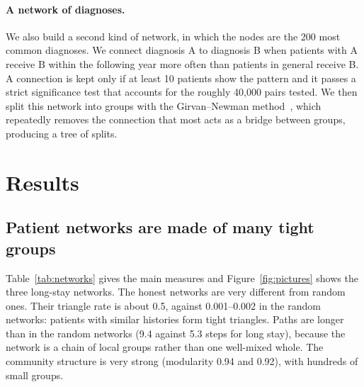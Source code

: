 \documentclass[11pt]{article}
\begin{document}
\paragraph{A network of diagnoses.} We also build a second kind of network, in which the nodes are the 200 most common diagnoses. We connect diagnosis A to diagnosis B when patients with A receive B within the following year more often than patients in general receive B. A connection is kept only if at least 10 patients show the pattern and it passes a strict significance test that accounts for the roughly 40,000 pairs tested. We then split this network into groups with the Girvan--Newman method~\cite{girvan2002community}, which repeatedly removes the connection that most acts as a bridge between groups, producing a tree of splits.

\section{Results}
\label{sec:results}

\subsection{Patient networks are made of many tight groups}

Table~\ref{tab:networks} gives the main measures and Figure~\ref{fig:pictures} shows the three long-stay networks. The honest networks are very different from random ones. Their triangle rate is about 0.5, against 0.001--0.002 in the random networks: patients with similar histories form tight triangles. Paths are longer than in the random networks (9.4 against 5.3 steps for long stay), because the network is a chain of local groups rather than one well-mixed whole. The community structure is very strong (modularity 0.94 and 0.92), with hundreds of small groups.
\end{document}
